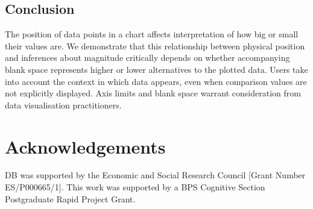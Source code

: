 \documentclass[journal]{vgtc}                %
\begin{document}
\hypertarget{conclusion}{%
\subsection{Conclusion}\label{conclusion}}

The position of data points in a chart affects interpretation of how big or small their values are. We demonstrate that this relationship between physical position and inferences about magnitude critically depends on whether accompanying blank space represents higher or lower alternatives to the plotted data. Users take into account the context in which data appears, even when comparison values are not explicitly displayed. Axis limits and blank space warrant consideration from data visualisation practitioners.

\hypertarget{acknowledgements}{%
\section{Acknowledgements}\label{acknowledgements}}

DB was supported by the Economic and Social Research Council {[}Grant Number ES/P000665/1{]}. This work was supported by a BPS Cognitive Section Postgraduate Rapid Project Grant.

%

%
%
%
%


\end{document}
